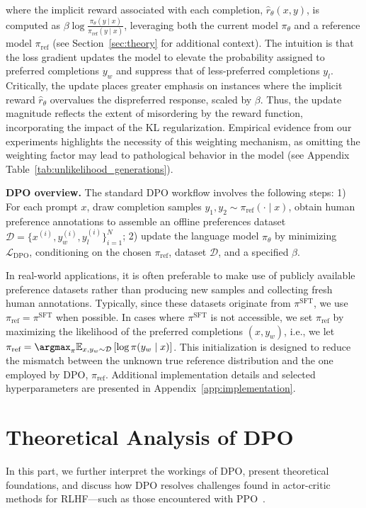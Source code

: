 where the implicit reward associated with each completion, $\hat{r}_\theta(x, y)$, is computed as $\beta \log \frac{\pi_\theta(y \mid x)}{\pi_\text{ref}(y \mid x)}$, leveraging both the current model $\pi_\theta$ and a reference model $\pi_\text{ref}$ (see Section~\ref{sec:theory} for additional context). The intuition is that the loss gradient updates the model to elevate the probability assigned to preferred completions $y_w$ and suppress that of less-preferred completions $y_l$. Critically, the update places greater emphasis on instances where the implicit reward $\hat{r}_\theta$ overvalues the dispreferred response, scaled by $\beta$. Thus, the update magnitude reflects the extent of misordering by the reward function, incorporating the impact of the KL regularization. Empirical evidence from our experiments highlights the necessity of this weighting mechanism, as omitting the weighting factor may lead to pathological behavior in the model (see Appendix Table~\ref{tab:unlikelihood_generations}).

\textbf{DPO overview.} The standard DPO workflow involves the following steps: 1) For each prompt $x$, draw completion samples $y_1, y_2 \sim \pi_\text{ref}(\cdot \mid x)$, obtain human preference annotations to assemble an offline preferences dataset $\mathcal{D} = \{x^{(i)}, y_w^{(i)}, y_l^{(i)}\}_{i=1}^N$; 2) update the language model $\pi_\theta$ by minimizing $\mathcal{L}_\text{DPO}$, conditioning on the chosen $\pi_\text{ref}$, dataset $\mathcal{D}$, and a specified $\beta$. 

In real-world applications, it is often preferable to make use of publicly available preference datasets rather than producing new samples and collecting fresh human annotations. Typically, since these datasets originate from $\pi^\text{SFT}$, we use $\pi_\text{ref} = \pi^\text{SFT}$ when possible. In cases where $\pi^\text{SFT}$ is not accessible, we set $\pi_\text{ref}$ by maximizing the likelihood of the preferred completions ${(x, y_w)}$, i.e., we let ${\pi_\text{ref} = \argmax_{\pi}\mathbb{E}_{x, y_w \sim \mathcal{D}}\left[\log \pi(y_w \mid x)\right]}$. This initialization is designed to reduce the mismatch between the unknown true reference distribution and the one employed by DPO, $\pi_\text{ref}$. Additional implementation details and selected hyperparameters are presented in Appendix~\ref{app:implementation}.

\section{Theoretical Analysis of DPO} In this part, we further interpret the workings of DPO, present theoretical foundations, and discuss how DPO resolves challenges found in actor-critic methods for RLHF—such as those encountered with PPO~\cite{schulman2017proximal}.

